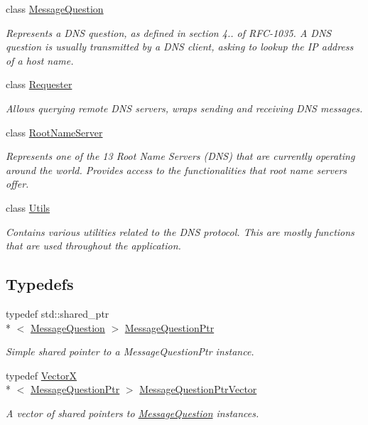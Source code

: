 \begin{DoxyCompactItemize}
class \hyperlink{class_senergy_1_1_dns_1_1_message_question}{Message\-Question}
\begin{DoxyCompactList}\small\item\em Represents a D\-N\-S question, as defined in section 4.. of R\-F\-C-\/1035. A D\-N\-S question is usually transmitted by a D\-N\-S client, asking to lookup the I\-P address of a host name. \end{DoxyCompactList}\item 
class \hyperlink{class_senergy_1_1_dns_1_1_requester}{Requester}
\begin{DoxyCompactList}\small\item\em Allows querying remote D\-N\-S servers, wraps sending and receiving D\-N\-S messages. \end{DoxyCompactList}\item 
class \hyperlink{class_senergy_1_1_dns_1_1_root_name_server}{Root\-Name\-Server}
\begin{DoxyCompactList}\small\item\em Represents one of the 13 Root Name Servers (D\-N\-S) that are currently operating around the world. Provides access to the functionalities that root name servers offer. \end{DoxyCompactList}\item 
class \hyperlink{class_senergy_1_1_dns_1_1_utils}{Utils}
\begin{DoxyCompactList}\small\item\em Contains various utilities related to the D\-N\-S protocol. This are mostly functions that are used throughout the application. \end{DoxyCompactList}\end{DoxyCompactItemize}
\subsection*{Typedefs}
\begin{DoxyCompactItemize}
\item 
typedef std\-::shared\-\_\-ptr\\*
$<$ \hyperlink{class_senergy_1_1_dns_1_1_message_question}{Message\-Question} $>$ \hyperlink{namespace_senergy_1_1_dns_a425a2a6f3b5c18973c524a99bdfa4ef0}{Message\-Question\-Ptr}
\begin{DoxyCompactList}\small\item\em Simple shared pointer to a Message\-Question\-Ptr instance. \end{DoxyCompactList}\item 
typedef \hyperlink{class_senergy_1_1_vector_x}{Vector\-X}\\*
$<$ \hyperlink{namespace_senergy_1_1_dns_a425a2a6f3b5c18973c524a99bdfa4ef0}{Message\-Question\-Ptr} $>$ \hyperlink{namespace_senergy_1_1_dns_a6983ff2422cfa510ca61831ae5cf1ffc}{Message\-Question\-Ptr\-Vector}
\begin{DoxyCompactList}\small\item\em A vector of shared pointers to \hyperlink{class_senergy_1_1_dns_1_1_message_question}{Message\-Question} instances. \end{DoxyCompactList}\end{DoxyCompactItemize}
